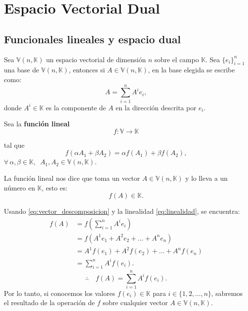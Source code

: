 \documentclass[../apunte_mecanica_clasica.tex]{subfiles}%
\begin{document}
\chapter{Espacio Vectorial Dual}


\section{Funcionales lineales y espacio dual}

Sea $\mathbb{V}(n,\mathbb{K})$ un espacio vectorial de dimensión $n$ sobre el campo $\mathbb{K}$. 
Sea $\{e_i\}_{i=1}^n$ una base de $\mathbb{V}(n,\mathbb{K})$, entonces si 
$A \in \mathbb{V}(n,\mathbb{K})$, en la base elegida se escribe como:
\begin{equation} \label{eq:vector_descomposicion}
    A = \sum_{i=1}^n A^i e_i,
\end{equation}
donde $A^i \in \mathbb{K}$ es la componente de $A$ en la dirección descrita por $e_i$.

Sea la \textbf{función lineal}
\begin{equation*}
    f : \mathbb{V} \longrightarrow \mathbb{K}
\end{equation*}

tal que
\begin{equation} \label{eq:linealidad}
    f(\alpha A_1 + \beta A_2) = \alpha f(A_1) + \beta f(A_2),
\end{equation}
$\forall \, \alpha, \beta \in \mathbb{K}, \;\; A_1, A_2 \in \mathbb{V}(n,\mathbb{K}).$

La función lineal nos dice que toma un vector $A \in \mathbb{V}(n,\mathbb{K})$ 
y lo lleva a un número en $\mathbb{K}$, esto es:
\begin{equation*}
    f(A) \in \mathbb{K}.
\end{equation*}

Usando \eqref{eq:vector_descomposicion} y la linealidad 
\eqref{eq:linealidad}, se encuentra:
\begin{align*}
    f(A) &= f\!\left(\sum_{i=1}^n A^i e_i \right) \\[6pt]
         &= f(A^1 e_1 + A^2 e_2 + \dots + A^n e_n) \\[6pt]
         &= A^1 f(e_1) + A^2 f(e_2) + \dots + A^n f(e_n) \\[6pt]
         &= \sum_{i=1}^n A^i f(e_i).
\end{align*}
\begin{equation*}
    \therefore \quad f(A) = \sum_{i=1}^n A^i f(e_i).
\end{equation*}
Por lo tanto, si conocemos los valores $f(e_i) \in \mathbb{K}$ 
para $i \in \{ 1,2,\dots,n\}$, sabremos el resultado de la operación de 
$f$ sobre cualquier vector $A \in \mathbb{V}(n,\mathbb{K})$.
\end{document}
